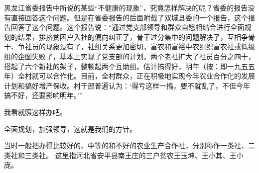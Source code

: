 黑龙江省委报告中所说的某些“不健康的现象”，究竟怎样解决的呢？省委的报告没有直接回答这个问题。但是在省委报告的后面附载了双城县委的一个报告，这个报告回答了这个问题。这个报告说：“通过党支部领导和群众自愿相结合进行全面规划的结果，排挤贫困户入社的偏向纠正了，骨干过分集中的问题解决了，互相争骨干、争社员的现象没有了，社组关系更加密切，富农和富裕中农组织富农社或低级组的企图失败了，基本上实现了党支部的计划。两个老社扩大了社员百分之四十，搭起了六个新社的架子，整顿起两个互助组。估计搞得好，明年（按：即一九五五年）全村就可以合作化。目前，全村群众，正在积极地实现今年农业合作化的发展计划和搞好增产保收。村干部普遍认为：‘得亏这样一搞，要不就乱了，不但今年搞不好，还要影响明年。’”

我看就照这样办吧。

全面规划，加强领导，这就是我们的方针。


\begin{maonote}
当时一般把办得比较好的、中等的和不好的农业生产合作社，分别称作一类社、二类社和三类社。
这里指河北省安平县南王庄的三户贫农王玉坤、王小其、王小庞。
\end{maonote}
